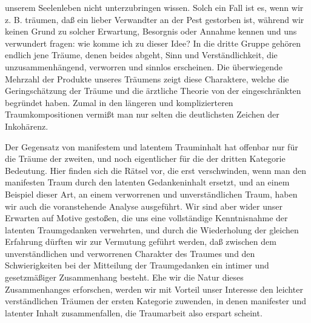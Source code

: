 \documentclass{article}
\begin{document}
         
            
            
            
        \pstart
        unserem Seelenleben nicht unterzubringen wissen. Solch ein Fall ist
               es, wenn wir z. B. träumen, daß ein lieber Verwandter an der Pest gestorben ist,
               während wir keinen Grund zu solcher Erwartung, Besorgnis oder Annahme kennen und
               uns verwundert fragen: wie komme ich zu dieser Idee? In die dritte Gruppe
               gehören endlich jene Träume, denen beides abgeht, Sinn und Verständlichkeit, die
                  unzusammenhängend, verworren und sinnlos erscheinen. Die
               überwiegende Mehrzahl der Produkte unseres Träumens zeigt diese
               Charaktere, welche die Geringschätzung der Träume und die ärztliche
               Theorie von der eingeschränkten 
     begründet haben. Zumal in den längeren und komplizierteren
               Traumkompositionen vermißt man nur selten die deutlichsten Zeichen der
               Inkohärenz.
        \pend
    
            
        \pstart
        Der Gegensatz von manifestem und latentem Trauminhalt hat offenbar nur für die
               Träume der zweiten, und noch eigentlicher für die der dritten Kategorie
               Bedeutung. Hier finden sich die Rätsel vor, die erst verschwinden, wenn man den
               manifesten Traum durch den latenten Gedankeninhalt ersetzt, und an einem
               Beispiel dieser Art, an einem verworrenen und unverständlichen Traum, haben wir
               auch die voranstehende Analyse ausgeführt. Wir sind aber wider unser Erwarten
               auf Motive gestoßen, die uns eine vollständige Kenntnisnahme der latenten
               Traumgedanken verwehrten, und durch die Wiederholung der gleichen Erfahrung
               dürften wir zur Vermutung geführt werden, daß zwischen dem
                  unverständlichen und verworrenen Charakter des Traumes und den Schwierigkeiten bei der
                  Mitteilung der Traumgedanken ein intimer und gesetzmäßiger Zusammenhang
                  besteht. Ehe wir die Natur dieses Zusammenhanges erforschen, werden wir
               mit Vorteil unser Interesse den leichter verständlichen Träumen der ersten
               Kategorie zuwenden, in denen manifester und latenter Inhalt zusammenfallen, die
               Traumarbeit also erspart scheint.
        \pend
    
\end{document}
